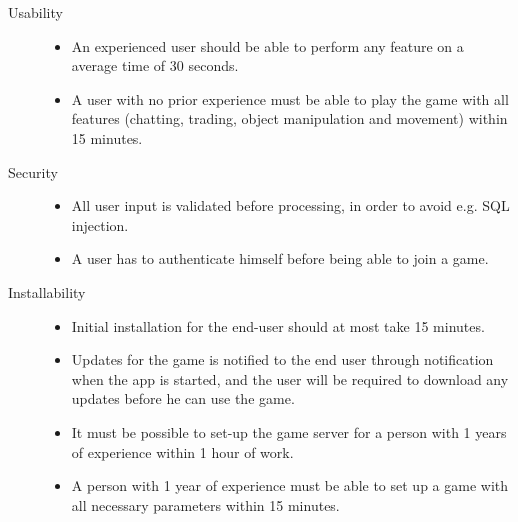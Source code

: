 \begin{description}
\item [Usability] \hfill 
	\begin{itemize}
		\item An experienced user should be able to perform any feature on a average time of 30 seconds. 
		\item A user with no prior experience must be able to play the game with all features (chatting, trading, object manipulation and movement) within 15 minutes.
	\end{itemize}

\item[Security] \hfill 
	\begin{itemize}
		\item All user input is validated before processing, in order to avoid e.g. SQL injection.
		\item A user has to authenticate himself before being able to join a game. 
	\end{itemize}

 

\item[Installability] \hfill 
	\begin{itemize}
	     \item Initial installation for the end-user should at most take 15 minutes. 
	     \item Updates for the game is notified to the end user through notification when the app is started, and the user will be required to download any updates before he can use the game.
	     \item It must be possible to set-up the game server for a person with 1 years of experience within 1 hour of work. 
	     \item A person with 1 year of experience must be able to set up a game with all necessary parameters within 15 minutes. 
	\end{itemize}

 
\end{description}
